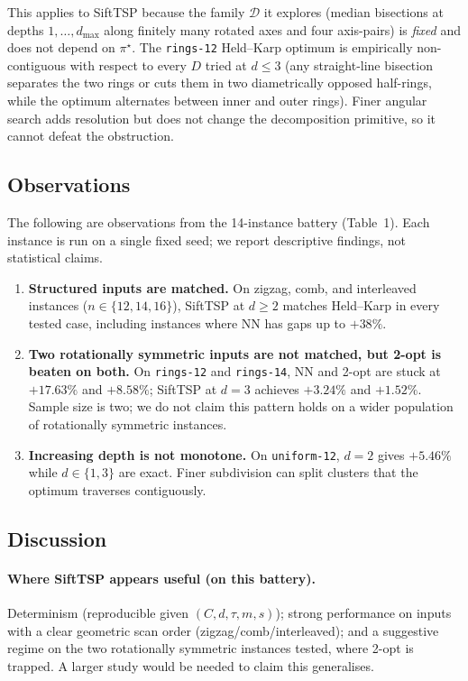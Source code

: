 \documentclass[11pt,a4paper]{article}
\begin{document}
This applies to SiftTSP because the family $\mathcal{D}$ it explores
(median bisections at depths $1, \dots, d_{\max}$ along finitely many
rotated axes and four axis-pairs) is \emph{fixed} and does not depend
on $\pi^{\star}$. The \texttt{rings-12} Held--Karp optimum is empirically
non-contiguous with respect to every $D$ tried at $d \leq 3$ (any
straight-line bisection separates the two rings or cuts them in two
diametrically opposed half-rings, while the optimum alternates between
inner and outer rings). Finer angular search adds resolution but does
not change the decomposition primitive, so it cannot defeat the
obstruction.

\subsection{Observations}

The following are observations from the 14-instance battery (Table~1).
Each instance is run on a single fixed seed; we report descriptive
findings, not statistical claims.

\begin{enumerate}
\item \textbf{Structured inputs are matched.} On zigzag, comb, and
interleaved instances ($n \in \{12, 14, 16\}$), SiftTSP at $d \geq 2$
matches Held--Karp in every tested case, including instances where NN
has gaps up to $+38\%$.
\item \textbf{Two rotationally symmetric inputs are not matched, but
2-opt is beaten on both.} On \texttt{rings-12} and \texttt{rings-14},
NN and 2-opt are stuck at $+17.63\%$ and $+8.58\%$; SiftTSP at $d=3$
achieves $+3.24\%$ and $+1.52\%$. Sample size is two; we do not claim
this pattern holds on a wider population of rotationally symmetric
instances.
\item \textbf{Increasing depth is not monotone.} On \texttt{uniform-12},
$d{=}2$ gives $+5.46\%$ while $d \in \{1, 3\}$ are exact. Finer
subdivision can split clusters that the optimum traverses contiguously.
\end{enumerate}

\subsection{Discussion}

\paragraph{Where SiftTSP appears useful (on this battery).} Determinism
(reproducible given $(C, d, \tau, m, s)$); strong performance on inputs
with a clear geometric scan order (zigzag/comb/interleaved); and a
suggestive regime on the two rotationally symmetric instances tested,
where 2-opt is trapped. A larger study would be needed to claim this
generalises.
\end{document}
